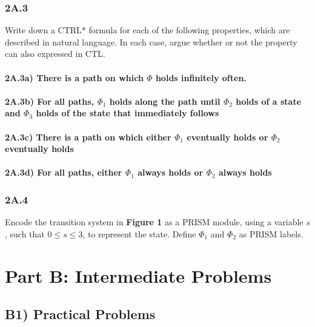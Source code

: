 \documentclass[12pt]{report}
\begin{document}
\subsection*{2A.3}
Write down a CTRL* formula for each of the following properties, which are described in natural language. In each case, argue whether or not the property can also expressed in CTL.

\subsubsection*{2A.3a) There is a path on which $\Phi$ holds infinitely often.}

\subsubsection*{2A.3b) For all paths, $\Phi_1$ holds along the path until $\Phi_2$ holds of a state and $\Phi_3$ holds of the state that immediately follows}

\subsubsection*{2A.3c) There is a path on which either $\Phi_1$ eventually holds or $\Phi_2$ eventually holds}

\subsubsection*{2A.3d) For all paths, either $\Phi_1$ always holds or $\Phi_2$ always holds}

\subsection*{2A.4}
Encode the transition system in \textbf{Figure 1} as a PRISM module, using a variable $s$, such that $0 \leq s \leq 3$, to represent the state. Define $\Phi_1$ and $\Phi_2$ as PRISM labels.

\chapter*{Part B: Intermediate Problems}
\section*{B1) Practical Problems}
\end{document}
